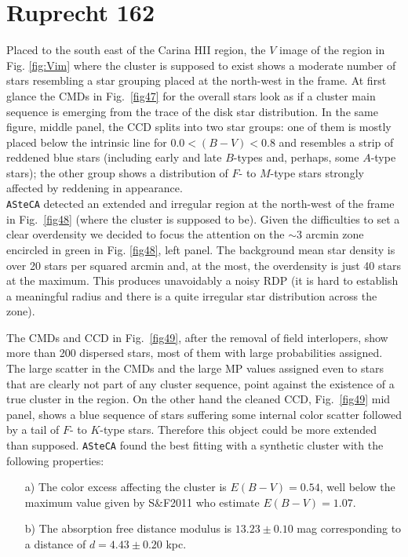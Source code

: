 \documentclass[draft]{aa}
\begin{document}
\section{Ruprecht 162}
\label{app:rup162}

Placed to the south east of the Carina HII region, the $V$ image of the region
in Fig. \ref{fig:Vim} where the cluster is supposed to exist shows a moderate
number of stars resembling a star grouping placed at the north-west in the
frame. At first glance the CMDs in Fig.~\ref{fig47} for the overall stars look
as if a cluster main sequence is emerging from the trace of the disk star
distribution.
In the same figure, middle panel, the CCD splits into two star groups: one of
them is mostly placed below the intrinsic line for $0.0<(B-V)< 0.8$ and
resembles a strip of reddened blue stars (including early and late $B$-types
and, perhaps, some $A$-type stars); the other group shows a distribution of $F$-
to $M$-type stars strongly affected by reddening in appearance.\\

\texttt{ASteCA} detected an extended and irregular region at the north-west of
the frame in Fig.~\ref{fig48} (where the cluster is supposed to be). Given the
difficulties to set a clear overdensity we decided to focus the attention on
the $\sim3$ arcmin zone encircled in green in Fig. \ref{fig48}, left panel.
The background mean star density is over 20 stars per squared arcmin and, at
the most, the overdensity is just 40 stars at the maximum. This produces
unavoidably a noisy RDP (it is hard to establish a meaningful radius and there
is a quite irregular star distribution across the zone).

The CMDs and CCD in Fig.~\ref{fig49}, after the removal of field interlopers,
show more than 200 dispersed stars, most of them with large probabilities
assigned. The large scatter in the CMDs and the large MP values assigned even
to stars that are clearly not part of any cluster sequence, point against the
existence of a true cluster in the region.
On the other hand the cleaned CCD, Fig.~\ref{fig49} mid panel, shows a blue
sequence of stars suffering some internal color scatter followed by a tail of
$F$- to $K$-type stars. Therefore this object could be more extended than
supposed. \texttt{ASteCA} found the best fitting with a synthetic cluster with
the following properties:

\begin{itemize}
\item [a)] The color excess affecting the cluster is $E(B-V)=0.54$, well
below the maximum value given by S\&F2011 who estimate $E(B-V)=1.07$.
\item [b)] The absorption free distance modulus is $13.23\pm0.10$ mag
corresponding to a distance of $d=4.43\pm0.20$ kpc.
\end{itemize}
\end{document}
